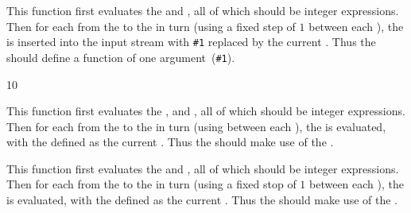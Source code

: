 \documentclass[oneside]{book}
\begin{document}
\begin{function}{\intStepOneInline}
\begin{syntax}
   
\end{syntax}
This function first evaluates the  and ,
all of which should be integer expressions.
Then for each  from the  to the
 in turn (using a fixed step of $1$ between each
), the  is inserted into the input stream
with \verb|#1| replaced by the current . Thus the
 should define a function of one argument~(\verb|#1|).
\begin{demohigh}
\IgnoreSpacesOn
\tlClear \lTmpaTl
{} {10} {
  \tlPutRight \lTmpaTl {[#1]}
}
\tlUse \lTmpaTl
\IgnoreSpacesOff
\end{demohigh}
\end{function}

\begin{function}{\intStepVariable}
\begin{syntax}
     
\end{syntax}
This function first evaluates the , 
and , all of which should be integer expressions.
Then for each  from the  to the
 in turn (using  between each
), the  is evaluated,
with the  defined as the current . Thus
the  should make use of the .
\end{function}

\begin{function}{\intStepOneVariable}
\begin{syntax}
    
\end{syntax}
This function first evaluates the  and ,
all of which should be integer expressions.
Then for each  from the  to the
 in turn (using a fixed stop of $1$ between each
), the  is evaluated,
with the  defined as the current . Thus
the  should make use of the .
\end{function}
\end{document}
